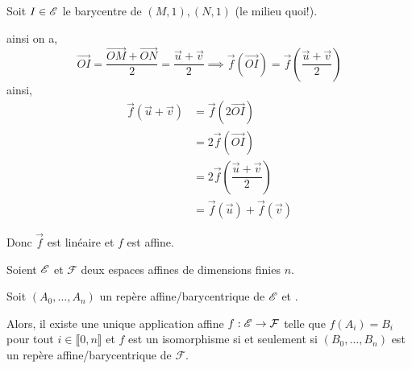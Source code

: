 \documentclass[a4paper, 12pt]{article}
\begin{document}
\begin{demonstration}
\begin{description}
\begin{description}
            Soit $I \in \mathscr{E}$ le barycentre de $(M, 1), (N, 1)$ (le milieu quoi!).

            ainsi on a,
            $$
            \overrightarrow{OI} = \dfrac{\overrightarrow{OM} + \overrightarrow{ON}}{2} = \dfrac{\vec{u} + \vec{v}}{2} \implies \vec{f}(\overrightarrow{OI}) = \vec{f}\left(\dfrac{\vec{u} + \vec{v}}{2}\right)
            $$
            ainsi,
            \begin{align*}
                \vec{f}(\vec{u} + \vec{v}) &= \vec{f}(2 \overrightarrow{OI}) \\
                &= 2 \vec{f}(\overrightarrow{OI}) \\
                &= 2 \vec{f}\left(\dfrac{\vec{u} + \vec{v}}{2}\right) \\
                &= \vec{f}(\vec{u}) + \vec{f}(\vec{v})
            \end{align*}
        \end{description}
        Donc $\vec{f}$ est linéaire et $f$ est affine.
    \end{description}
\end{demonstration}

\begin{proposition}{}{}
    Soient $\mathscr{E}$ et $\mathcal{F}$ deux espaces affines de dimensions finies $n$.

    Soit $(A_0, \dots, A_n)$ un repère affine/barycentrique de $\mathscr{E}$ et .
    
    \vspace{0.5cm}
    Alors, il existe une unique application affine $f: \mathscr{E} \to \mathcal{F}$ telle que $f(A_i) = B_i$ pour tout $i \in \llbracket 0, n \rrbracket$ et $f$ est un isomorphisme si et seulement si
    $(B_0, \dots, B_n)$ est un repère affine/barycentrique de $\mathcal{F}$.
\end{proposition}
\end{document}
